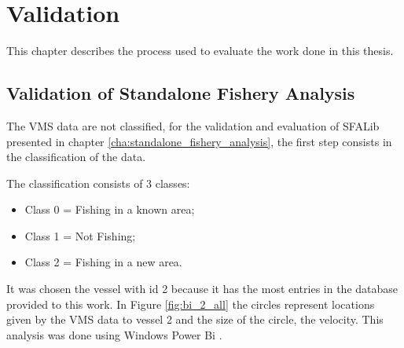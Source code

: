 % 
%  
%
\chapter{Validation}
\label{cha:validation}

This chapter describes the process used to evaluate the work done in this thesis.

\section{Validation of Standalone Fishery Analysis} %
\label{sec:val_SFA}

The VMS data are not classified, for the validation and evaluation of SFALib presented in chapter \ref{cha:standalone_fishery_analysis}, the first step consists in the classification of the data.

The classification consists of 3 classes:
\begin{itemize}
\item Class 0 = Fishing in a known area;
\item Class 1 = Not Fishing;
\item Class 2 = Fishing in a new area.
\end{itemize}   


It was chosen the vessel with id 2 because it has the most entries in the database provided to this work. In Figure \ref{fig:bi_2_all} the circles represent locations given by the VMS data to vessel 2 and the size of the circle, the velocity. This analysis was done using Windows Power Bi \cite{WEBSITE:PowerBi}.

